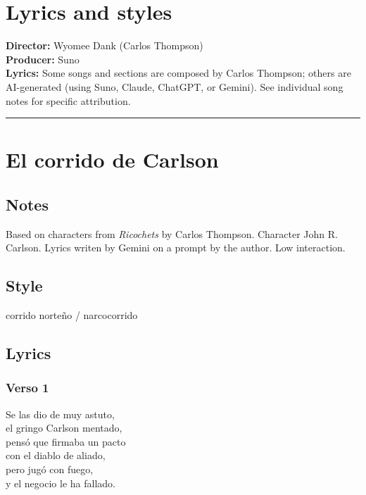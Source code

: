 \section{Lyrics and styles}\label{lyrics-and-styles}

\textbf{Director:} Wyomee Dank (Carlos Thompson)\\
\textbf{Producer:} Suno\\
\textbf{Lyrics:} Some songs and sections are composed by Carlos
Thompson; others are AI-generated (using Suno, Claude, ChatGPT, or
Gemini). See individual song notes for specific attribution.

\begin{center}\rule{0.5\linewidth}{0.5pt}\end{center}

\section{El corrido de Carlson}\label{el-corrido-de-carlson}

\subsection{Notes}\label{notes}

Based on characters from \emph{Ricochets} by Carlos Thompson. Character
John R. Carlson. Lyrics writen by Gemini on a prompt by the author. Low
interaction.

\subsection{Style}\label{style}

corrido norteño / narcocorrido

\subsection{Lyrics}\label{lyrics}

\subsubsection{Verso 1}\label{verso-1}

Se las dio de muy astuto,\\
el gringo Carlson mentado,\\
pensó que firmaba un pacto\\
con el diablo de aliado,\\
pero jugó con fuego,\\
y el negocio le ha fallado.

